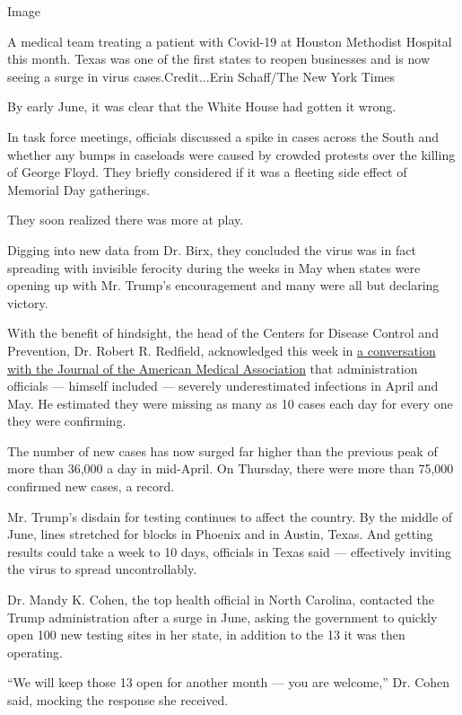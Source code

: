 Image

A medical team treating a patient with Covid-19 at Houston Methodist
Hospital this month. Texas was one of the first states to reopen
businesses and is now seeing a surge in virus cases.Credit...Erin
Schaff/The New York Times

By early June, it was clear that the White House had gotten it wrong.

In task force meetings, officials discussed a spike in cases across the
South and whether any bumps in caseloads were caused by crowded protests
over the killing of George Floyd. They briefly considered if it was a
fleeting side effect of Memorial Day gatherings.

They soon realized there was more at play.

Digging into new data from Dr. Birx, they concluded the virus was in
fact spreading with invisible ferocity during the weeks in May when
states were opening up with Mr. Trump's encouragement and many were all
but declaring victory.

With the benefit of hindsight, the head of the Centers for Disease
Control and Prevention, Dr. Robert R. Redfield, acknowledged this week
in
\href{https://jamanetwork.com/journals/jama/pages/conversations-with-dr-bauchner}{a
conversation with the Journal of the American Medical Association} that
administration officials --- himself included --- severely
underestimated infections in April and May. He estimated they were
missing as many as 10 cases each day for every one they were confirming.

The number of new cases has now surged far higher than the previous peak
of more than 36,000 a day in mid-April. On Thursday, there were more
than 75,000 confirmed new cases, a record.

Mr. Trump's disdain for testing continues to affect the country. By the
middle of June, lines stretched for blocks in Phoenix and in Austin,
Texas. And getting results could take a week to 10 days, officials in
Texas said --- effectively inviting the virus to spread uncontrollably.

Dr. Mandy K. Cohen, the top health official in North Carolina, contacted
the Trump administration after a surge in June, asking the government to
quickly open 100 new testing sites in her state, in addition to the 13
it was then operating.

``We will keep those 13 open for another month --- you are welcome,''
Dr. Cohen said, mocking the response she received.

